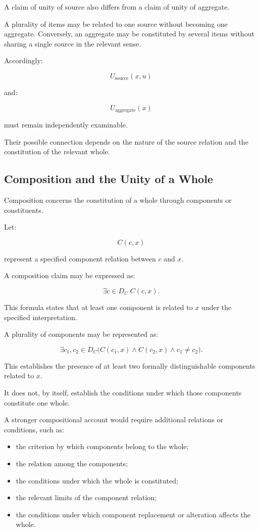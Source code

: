 A claim of unity of source also differs from
a claim of unity of aggregate.

A plurality of items may be related to one
source without becoming one aggregate.
Conversely, an aggregate may be constituted
by several items without sharing a single
source in the relevant sense.

Accordingly:

\[
    U_{\mathrm{source}}(x,u)
\]

and:

\[
    U_{\mathrm{aggregate}}(x)
\]

must remain independently examinable.

Their possible connection depends on the
nature of the source relation and the
constitution of the relevant whole.

\subsection{Composition and the Unity of a Whole}

Composition concerns the constitution of
a whole through components or constituents.

Let:

\[
    C(c,x)
\]

represent a specified component relation
between \(c\) and \(x\).

A composition claim may be expressed as:

\[
    \exists c \in D_C\; C(c,x).
\]

This formula states that at least one
component is related to \(x\) under the
specified interpretation.

A plurality of components may be represented
as:

\[
    \exists c_1,c_2 \in D_C
    \bigl(
        C(c_1,x)
        \land
        C(c_2,x)
        \land
        c_1 \neq c_2
    \bigr).
\]

This establishes the presence of at least
two formally distinguishable components
related to \(x\).

It does not, by itself, establish the
conditions under which those components
constitute one whole.

A stronger compositional account would
require additional relations or conditions,
such as:

\begin{itemize}
    \item the criterion by which components
    belong to the whole;
    \item the relation among the components;
    \item the conditions under which the
    whole is constituted;
    \item the relevant limits of the
    component relation;
    \item the conditions under which
    component replacement or alteration
    affects the whole.
\end{itemize}

